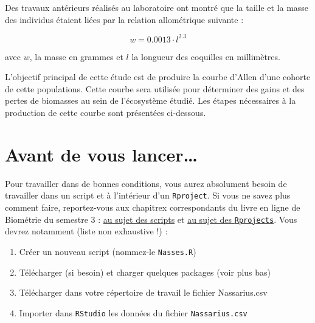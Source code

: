 \documentclass[
  a4paper,
  DIV=11,
  numbers=noendperiod,
  oneside]{scrreprt}
\providecommand{\tightlist}{%
  \setlength{\itemsep}{0pt}\setlength{\parskip}{0pt}}\usepackage{longtable,booktabs,array}
\begin{document}
Des travaux antérieurs réalisés au laboratoire ont montré que la taille
et la masse des individus étaient liées par la relation allométrique
suivante :

\[w = 0.0013 \cdot l^{2.3}\]

avec \(w\), la masse en grammes et \(l\) la longueur des coquilles en
millimètres.

\begin{tcolorbox}[enhanced jigsaw, toprule=.15mm, coltitle=black, colframe=quarto-callout-important-color-frame, titlerule=0mm, leftrule=.75mm, opacityback=0, bottomrule=.15mm, title=\textcolor{quarto-callout-important-color}{\faExclamation}\hspace{0.5em}{Objectif principal}, colbacktitle=quarto-callout-important-color!10!white, breakable, colback=white, left=2mm, toptitle=1mm, arc=.35mm, bottomtitle=1mm, rightrule=.15mm, opacitybacktitle=0.6]
L'objectif principal de cette étude est de produire la courbe d'Allen
d'une cohorte de cette populations. Cette courbe sera utilisée pour
déterminer des gains et des pertes de biomasses au sein de l'écosystème
étudié. Les étapes nécessaires à la production de cette courbe sont
présentées ci-dessous.
\end{tcolorbox}

\hypertarget{avant-de-vous-lancer}{%
\section{Avant de vous lancer\ldots{}}\label{avant-de-vous-lancer}}

Pour travailler dans de bonnes conditions, vous aurez absolument besoin
de travailler dans un script et à l'intérieur d'un \texttt{Rproject}. Si
vous ne savez plus comment faire, reportez-vous aux chapitrex
correspondants du livre en ligne de Biométrie du semestre 3 :
\href{https://besibo.github.io/BiometrieS3/01-R-basics.html\#sec-script}{au
sujet des scripts} et
\href{https://besibo.github.io/BiometrieS3/01-R-basics.html\#les-projets-ou-rprojects}{au
sujet des \texttt{Rprojects}}. Vous devrez notamment (liste non
exhaustive !) :

\begin{enumerate}
\def\labelenumi{\arabic{enumi}.}
\tightlist
\item
  Créer un nouveau script (nommez-le \texttt{Nasses.R})
\item
  Télécharger (si besoin) et charger quelques packages (voir plus bas)
\item
  Télécharger dans votre répertoire de travail le fichier Nassarius.csv
\item
  Importer dans \texttt{RStudio} les données du fichier
  \texttt{Nassarius.csv}
\end{enumerate}
\end{document}
